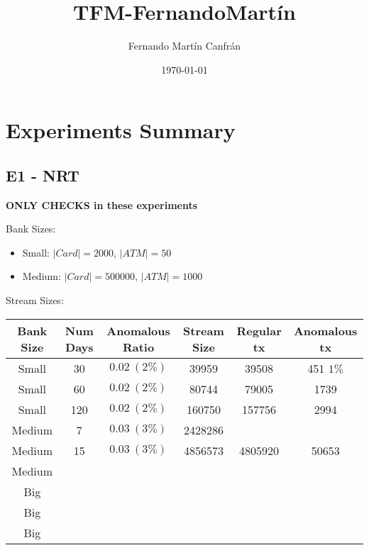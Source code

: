 \documentclass[12pt,a4paper]{article}
\title{TFM-FernandoMartín}
\author{Fernando Martín Canfrán}
\date{\today}
\begin{document}
\maketitle

\section{Experiments Summary}


\subsection{E1 - NRT}

\textbf{ONLY CHECKS in these experiments}

Bank Sizes:
\begin{itemize}
    \item Small: $|Card| = 2000$, $|ATM| = 50$
    \item Medium: $|Card| = 500000$,  $|ATM| = 1000$
\end{itemize}

Stream Sizes:


\begin{table}[H]
    \begin{tabular}{|c|c|c|c|c|c|}
    \hline
    Bank Size & Num Days & Anomalous Ratio & Stream Size & Regular tx & Anomalous tx \\ \hline
    Small     & 30       & $0.02\ (2\%)$   & 39959       & 39508      & 451 $1\%$    \\ \hline
    Small     & 60       & $0.02\ (2\%)$   & 80744       & 79005      & 1739         \\ \hline
    Small     & 120      & $0.02\ (2\%)$   & 160750      & 157756     & 2994         \\ \hline
    Medium    & 7        & $0.03\ (3\%)$   & 2428286     &            &              \\ \hline
    Medium    & 15       & $0.03\ (3\%)$   & 4856573     & 4805920    & 50653        \\ \hline
    Medium    &          &                 &             &            &              \\ \hline
    Big       &          &                 &             &            &              \\ \hline
    Big       &          &                 &             &            &              \\ \hline
    Big       &          &                 &             &            &              \\ \hline
    \end{tabular}
\end{table}
    
\end{document}

